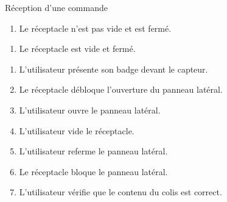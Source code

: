 ﻿\begin{UseCase}{Réception d'une commande}



\begin{UseCasePre}
    \begin{enumerate}
        \item Le réceptacle n'est pas vide et est fermé.
    \end{enumerate}
\end{UseCasePre}

\begin{UseCasePost}
    \begin{enumerate}
        \item Le réceptacle est vide et fermé.
    \end{enumerate}
\end{UseCasePost}

\begin{UseCaseScenario}
    \begin{enumerate}
        \item L'utilisateur présente son badge devant le capteur.
        \item Le réceptacle débloque l'ouverture du panneau latéral.
        \item L'utilisateur ouvre le panneau latéral.
        \item L'utilisateur vide le réceptacle.
        \item L'utilisateur referme le panneau latéral.
        \item Le réceptacle bloque le panneau latéral.
        \item L'utilisateur vérifie que le contenu du colis est correct.
    \end{enumerate}
\end{UseCaseScenario}


\end{UseCase}
